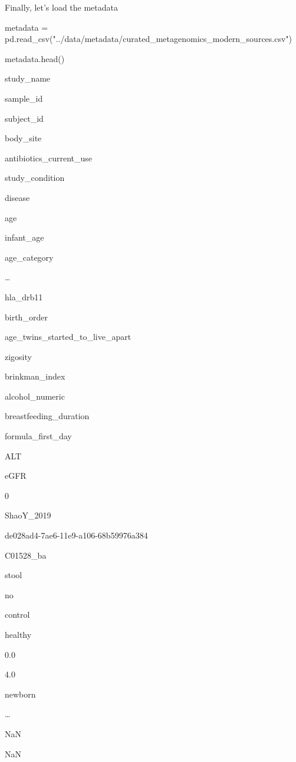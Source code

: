 \documentclass[
  letterpaper,
]{book}
\newenvironment{Shaded}{}{}
\newcommand{\NormalTok}[1]{\textcolor[rgb]{0.14,0.16,0.18}{#1}}
\newcommand{\OperatorTok}[1]{\textcolor[rgb]{0.14,0.16,0.18}{#1}}
\newcommand{\StringTok}[1]{\textcolor[rgb]{0.01,0.18,0.38}{#1}}
\begin{document}
Finally, let's load the metadata

\begin{Shaded}
\begin{Highlighting}[]
\NormalTok{metadata }\OperatorTok{=}\NormalTok{ pd.read\_csv(}\StringTok{"../data/metadata/curated\_metagenomics\_modern\_sources.csv"}\NormalTok{)}
\end{Highlighting}
\end{Shaded}

\begin{Shaded}
\begin{Highlighting}[]
\NormalTok{metadata.head()}
\end{Highlighting}
\end{Shaded}

study\_name

sample\_id

subject\_id

body\_site

antibiotics\_current\_use

study\_condition

disease

age

infant\_age

age\_category

\ldots{}

hla\_drb11

birth\_order

age\_twins\_started\_to\_live\_apart

zigosity

brinkman\_index

alcohol\_numeric

breastfeeding\_duration

formula\_first\_day

ALT

eGFR

0

ShaoY\_2019

de028ad4-7ae6-11e9-a106-68b59976a384

C01528\_ba

stool

no

control

healthy

0.0

4.0

newborn

\ldots{}

NaN

NaN
\end{document}
